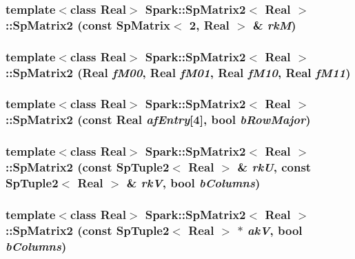 \subsubsection{\setlength{\rightskip}{0pt plus 5cm}template$<$class Real$>$ {\bf Spark::Sp\-Matrix2}$<$ Real $>$::{\bf Sp\-Matrix2} (const {\bf Sp\-Matrix}$<$ 2, Real $>$ \& {\em rk\-M})}\label{classSpark_1_1SpMatrix2_a2}


\subsubsection{\setlength{\rightskip}{0pt plus 5cm}template$<$class Real$>$ {\bf Spark::Sp\-Matrix2}$<$ Real $>$::{\bf Sp\-Matrix2} (Real {\em f\-M00}, Real {\em f\-M01}, Real {\em f\-M10}, Real {\em f\-M11})}\label{classSpark_1_1SpMatrix2_a3}


\subsubsection{\setlength{\rightskip}{0pt plus 5cm}template$<$class Real$>$ {\bf Spark::Sp\-Matrix2}$<$ Real $>$::{\bf Sp\-Matrix2} (const Real {\em af\-Entry}[4], bool {\em b\-Row\-Major})}\label{classSpark_1_1SpMatrix2_a4}


\subsubsection{\setlength{\rightskip}{0pt plus 5cm}template$<$class Real$>$ {\bf Spark::Sp\-Matrix2}$<$ Real $>$::{\bf Sp\-Matrix2} (const {\bf Sp\-Tuple2}$<$ Real $>$ \& {\em rk\-U}, const {\bf Sp\-Tuple2}$<$ Real $>$ \& {\em rk\-V}, bool {\em b\-Columns})}\label{classSpark_1_1SpMatrix2_a5}


\subsubsection{\setlength{\rightskip}{0pt plus 5cm}template$<$class Real$>$ {\bf Spark::Sp\-Matrix2}$<$ Real $>$::{\bf Sp\-Matrix2} (const {\bf Sp\-Tuple2}$<$ Real $>$ $\ast$ {\em ak\-V}, bool {\em b\-Columns})}\label{classSpark_1_1SpMatrix2_a6}


